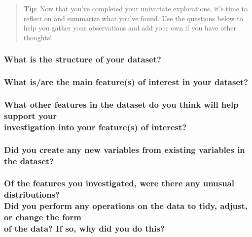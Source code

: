 \documentclass[]{article}
\begin{document}
\begin{quote}
\textbf{Tip}: Now that you've completed your univariate explorations,
it's time to reflect on and summarize what you've found. Use the
questions below to help you gather your observations and add your own if
you have other thoughts!
\end{quote}

\subsubsection{What is the structure of your
dataset?}\label{what-is-the-structure-of-your-dataset}

\subsubsection{What is/are the main feature(s) of interest in your
dataset?}\label{what-isare-the-main-features-of-interest-in-your-dataset}

\subsubsection{\texorpdfstring{What other features in the dataset do you
think will help support your\\
investigation into your feature(s) of
interest?}{What other features in the dataset do you think will help support your investigation into your feature(s) of interest?}}\label{what-other-features-in-the-dataset-do-you-think-will-help-support-your-investigation-into-your-features-of-interest}

\subsubsection{Did you create any new variables from existing variables
in the
dataset?}\label{did-you-create-any-new-variables-from-existing-variables-in-the-dataset}

\subsubsection{\texorpdfstring{Of the features you investigated, were
there any unusual distributions?\\
Did you perform any operations on the data to tidy, adjust, or change
the form\\
of the data? If so, why did you do
this?}{Of the features you investigated, were there any unusual distributions? Did you perform any operations on the data to tidy, adjust, or change the form of the data? If so, why did you do this?}}\label{of-the-features-you-investigated-were-there-any-unusual-distributions-did-you-perform-any-operations-on-the-data-to-tidy-adjust-or-change-the-form-of-the-data-if-so-why-did-you-do-this}
\end{document}
